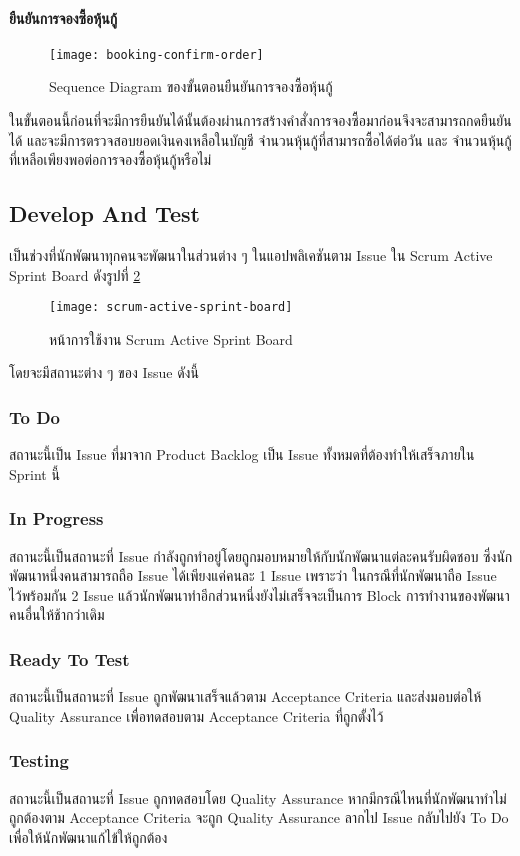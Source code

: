 \paragraph{ยืนยันการจองซื้อหุ้นกู้}
\begin{figure}[H]
    \centering
    \texttt{[image: booking-confirm-order]}
    \caption{Sequence Diagram ของขั้นตอนยืนยันการจองซื้อหุ้นกู้}\label{booking-confirm-order}
\end{figure}
ในขั้นตอนนี้ก่อนที่จะมีการยืนยันได้นั้นต้องผ่านการสร้างคำสั่งการจองซื้อมาก่อนจึงจะสามารถกดยืนยันได้ และจะมีการตรวจสอบยอดเงินคงเหลือในบัญชี
จำนวนหุ้นกู้ที่สามารถซื้อได้ต่อวัน และ จำนวนหุ้นกู้ที่เหลือเพียงพอต่อการจองซื้อหุ้นกู้หรือไม่

\subsection{Develop And Test}
เป็นช่วงที่นักพัฒนาทุกคนจะพัฒนาในส่วนต่าง ๆ ในแอปพลิเคชันตาม Issue ใน Scrum Active Sprint Board ดังรูปที่ \ref{scrum-active-sprint-board} 
\begin{figure}[H]
    \centering
    \texttt{[image: scrum-active-sprint-board]}
    \caption{หน้าการใช้งาน Scrum Active Sprint Board}\label{scrum-active-sprint-board}
\end{figure}
โดยจะมีสถานะต่าง ๆ ของ Issue ดังนี้
\subsubsection{To Do}
สถานะนี้เป็น Issue ที่มาจาก Product Backlog เป็น Issue ทั้งหมดที่ต้องทำให้เสร็จภายใน Sprint นี้
\subsubsection{In Progress}
สถานะนี้เป็นสถานะที่ Issue กำลังถูกทำอยู่โดยถูกมอบหมายให้กับนักพัฒนาแต่ละคนรับผิดชอบ ซึ่งนักพัฒนาหนึ่งคนสามารถถือ Issue ได้เพียงแค่คนละ 1 Issue เพราะว่า
ในกรณีที่นักพัฒนาถือ Issue ไว้พร้อมกัน 2 Issue แล้วนักพัฒนาทำอีกส่วนหนึ่งยังไม่เสร็จจะเป็นการ Block การทำงานของพัฒนาคนอื่นให้ช้ากว่าเดิม
\subsubsection{Ready To Test}
สถานะนี้เป็นสถานะที่ Issue ถูกพัฒนาเสร็จแล้วตาม Acceptance Criteria และส่งมอบต่อให้ Quality Assurance เพื่อทดสอบตาม Acceptance Criteria ที่ถูกตั้งไว้
\subsubsection{Testing}
สถานะนี้เป็นสถานะที่ Issue ถูกทดสอบโดย Quality Assurance หากมีกรณีไหนที่นักพัฒนาทำไม่ถูกต้องตาม Acceptance Criteria จะถูก Quality Assurance ลากไป Issue กลับไปยัง To Do เพื่อให้นักพัฒนาแก้ไข้ให้ถูกต้อง
